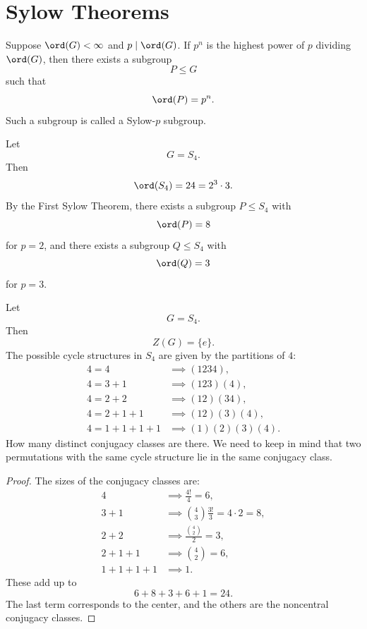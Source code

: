 
\section{Sylow Theorems}

\begin{theorem*}{
    Suppose $\ord(G)<\infty$ and $p\mid \ord(G)$.
    If $p^n$ is the highest power of $p$ dividing $\ord(G)$, then there exists a subgroup
    \[
        P\leq G
    \]
    such that
    \[
        \ord(P)=p^n.
    \]
    Such a subgroup is called a Sylow-$p$ subgroup.
}
\end{theorem*}

\begin{example}
    Let
    \[
        G=S_4.
    \]
    Then
    \[
        \ord(S_4)=24=2^3\cdot 3.
    \]
    By the First Sylow Theorem, there exists a subgroup $P\leq S_4$ with
    \[
        \ord(P)=8
    \]
    for $p=2$, and there exists a subgroup $Q\leq S_4$ with
    \[
        \ord(Q)=3
    \]
    for $p=3$.
\end{example}

\begin{example}
    Let
    \[
        G=S_4.
    \]
    Then
    \[
        Z(G)=\{e\}.
    \]
    The possible cycle structures in $S_4$ are given by the partitions of $4$:
    \begin{align*}
        4=4 &\implies (1234),\\
        4=3+1 &\implies (123)(4),\\
        4=2+2 &\implies (12)(34),\\
        4=2+1+1 &\implies (12)(3)(4),\\
        4=1+1+1+1 &\implies (1)(2)(3)(4).
    \end{align*}
    How many distinct conjugacy classes are there.
    We need to keep in mind that two permutations with the same cycle structure lie in the same conjugacy class.
\end{example}

\begin{proof}
    The sizes of the conjugacy classes are:
    \begin{align*}
        4 &\implies \frac{4!}{4}=6,\\
        3+1 &\implies \binom{4}{3}\frac{3!}{3}=4\cdot 2=8,\\
        2+2 &\implies \frac{\binom{4}{2}}{2}=3,\\
        2+1+1 &\implies \binom{4}{2}=6,\\
        1+1+1+1 &\implies 1.
    \end{align*}
    These add up to
    \[
        6+8+3+6+1=24.
    \]
    The last term corresponds to the center, and the others are the noncentral conjugacy classes.
\end{proof}

